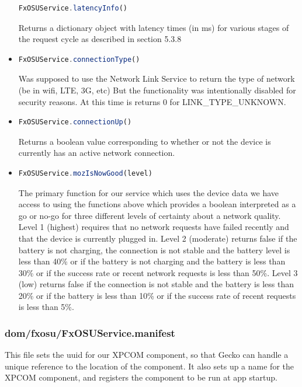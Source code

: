 \documentclass[12pt]{article}
\begin{document}
\begin{itemize}
\begin{lstlisting}[language=JavaScript]
FxOSUService.latencyInfo()
    \end{lstlisting}
    Returns a dictionary object with latency times (in ms) for various stages of the request cycle as described in section 5.3.8
  \item \begin{lstlisting}[language=JavaScript]
FxOSUService.connectionType()
    \end{lstlisting}  
    Was supposed to use the Network Link Service to return the type of network (be in wifi, LTE, 3G, etc) But the functionality was intentionally disabled for security reasons.  At this time is returns 0 for LINK\_TYPE\_UNKNOWN. 
  \item \begin{lstlisting}[language=JavaScript]
FxOSUService.connectionUp()
    \end{lstlisting}
    Returns a boolean value corresponding to whether or not the device is currently has an active network connection. 
  \item \begin{lstlisting}[language=JavaScript]
FxOSUService.mozIsNowGood(level)
    \end{lstlisting}
    The primary function for our service which uses the device data we have access to using the functions above which provides a boolean interpreted as a go or no-go for three different levels of certainty about a network quality. Level 1 (highest) requires that no network requests have failed recently and that the device is currently plugged in.  Level 2 (moderate) returns false if the battery is not charging, the connection is not stable and the battery level is less than 40\% or if the battery is not charging and the battery is less than 30\% or if the success rate or recent network requests is less than 50\%. Level 3 (low) returns false if the connection is not stable and the battery is less than 20\% or if the battery is less than 10\% or if the success rate of recent requests is less than 5\%.
\end{itemize}

\subsubsection{dom/fxosu/FxOSUService.manifest}
This file sets the uuid for our XPCOM component, so that Gecko can handle a unique reference to the location of the component. It also sets up a name for the XPCOM component, and registers the component to be run at app startup.
\end{document}
